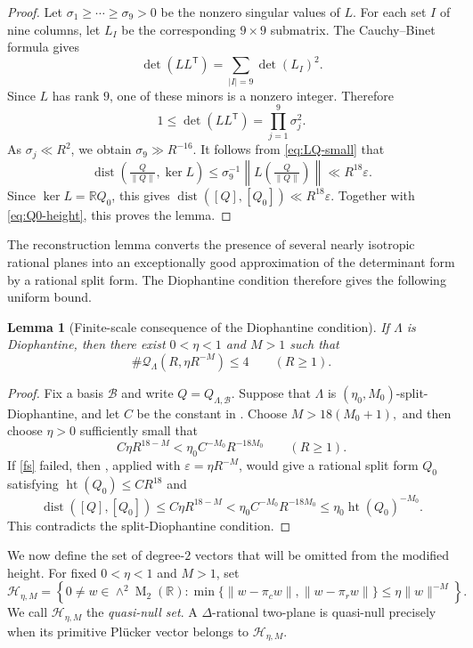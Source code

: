 \documentclass[reqno,11pt]{amsart}
\newtheorem{lem}[lem]{Lemma}
\theoremstyle{definition}
\theoremstyle{remark}
\numberwithin{equation}{section}
\newcommand{\M}{\operatorname{M}}
\begin{document}
\begin{proof}
Let $\sigma_1\ge\cdots\ge\sigma_9>0$ be the nonzero singular values of
$L$. For each set $I$ of nine columns, let $L_I$ be the corresponding
$9\times9$ submatrix. The Cauchy--Binet formula gives
$$
\det(LL^{\mathsf T})
=
\sum_{|I|=9}\det(L_I)^2.
$$
Since $L$ has rank $9$, one of these minors is a nonzero integer. Therefore
$$
1
\le
\det(LL^{\mathsf T})
=
\prod_{j=1}^9\sigma_j^2.
$$
As $\sigma_j\ll R^2$, we obtain $\sigma_9\gg R^{-16}$. It follows from
\eqref{eq:LQ-small} that
$$
\operatorname{dist}
\left(
\tfrac{Q}{\|Q\|},\ker L
\right)
\le
\sigma_9^{-1}
\left\|
L\left(\tfrac{Q}{\|Q\|}\right)
\right\|
\ll
R^{18}\varepsilon.
$$
Since $\ker L=\mathbb RQ_0$, this gives
$
\operatorname{dist}([Q],[Q_0])
\ll
R^{18}\varepsilon.
$
Together with \eqref{eq:Q0-height}, this proves the lemma.
\end{proof}

The reconstruction lemma converts the presence of several nearly isotropic
rational planes into an exceptionally good approximation of the determinant
form by a rational split form. The Diophantine condition therefore gives
the following uniform bound.

\begin{lem}[Finite-scale consequence of the Diophantine condition]
\label{lem:split-diophantine-implies-fs}
If $\Lambda$ is Diophantine, then there exist $0<\eta<1$ and $M>1$ such that
\begin{equation}\label{fs}
\#\mathcal Q_\Lambda(R,\eta R^{-M})\le4
\qquad
(R\ge1).
\end{equation}
\end{lem}

\begin{proof}
Fix a basis $\mathcal B$ and write $Q=Q_{\Lambda,\mathcal B}$. Suppose that
$\Lambda$ is $(\eta_0,M_0)$-split-Diophantine, and let $C$ be the constant
in . Choose
$M>18(M_0+1),$
and then choose $\eta>0$ sufficiently small that
$$
C\eta R^{18-M}
<
\eta_0C^{-M_0}R^{-18M_0}
\qquad
(R\ge1).
$$
If \eqref{fs} failed, then
, applied with
$\varepsilon=\eta R^{-M}$, would give a rational split form $Q_0$ satisfying
$
\operatorname{ht}(Q_0)\le CR^{18}
$
and
$$
\operatorname{dist}([Q],[Q_0])
\le
C\eta R^{18-M}
<
\eta_0C^{-M_0}R^{-18M_0}
\le
\eta_0\operatorname{ht}(Q_0)^{-M_0}.
$$
This contradicts the split-Diophantine condition.
\end{proof}

We now define the set of degree-$2$ vectors that will be omitted from the
modified height. For fixed $0<\eta<1$ and $M>1$, set
\begin{equation}\label{eq:d2-quasinull-cone}
\mathcal H_{\eta,M}
=
\left\{
0\ne w\in\wedge^2\M_2(\mathbb R):
\min\{\|w-\pi_cw\|,\|w-\pi_rw\|\}
\le
\eta\|w\|^{-M}
\right\}.
\end{equation}
We call $\mathcal H_{\eta,M}$ the \emph{quasi-null set}. A
$\Delta$-rational two-plane is quasi-null precisely when its primitive
Pl\"ucker vector belongs to $\mathcal H_{\eta,M}$.
\end{document}
